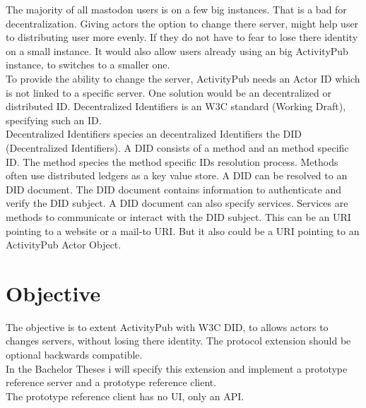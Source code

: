 \documentclass[conference]{IEEEtran}
\begin{document}
The majority of all mastodon users is on a few big instances. That is a bad for decentralization. Giving actors the option to change there server, might help user to distributing user more evenly. If they do not have to fear to lose there identity on a small instance. It would also allow users already using an big ActivityPub instance, to switches to a smaller one.\\
To provide the ability to change the server, ActivityPub needs an Actor ID which is not linked to a specific server. One solution would be an decentralized or distributed ID. Decentralized Identifiers is an W3C standard (Working Draft), specifying such an ID.\\
Decentralized Identifiers species an decentralized Identifiers the DID (Decentralized Identifiers). A DID consists of a method and an method specific ID. The method species the method specific IDs resolution process. Methods often use distributed ledgers as a key value store. A DID can be resolved to an DID document. The DID document contains information to authenticate and verify the DID subject. A DID document can also specify services. Services are methods to communicate or interact with the DID subject. This can be an URI pointing to a website or a mail-to URI. But it also could be a URI pointing to an ActivityPub Actor Object.
\section{Objective}
The objective is to extent ActivityPub with W3C DID, to allows actors to changes servers, without losing there identity. The protocol extension should be optional backwards compatible.\\
In the Bachelor Theses i will specify this extension and implement a prototype reference server and a prototype reference client.\\
The prototype reference client has no UI, only an API.
\end{document}
